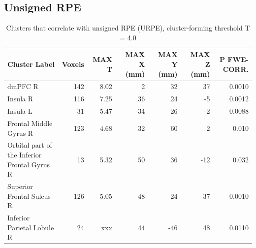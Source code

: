 \subsection{Unsigned RPE}

\begin{table}[htbp]
    \centering
    \begin{threeparttable}
    \caption{Clusters that correlate with unsigned RPE (URPE), cluster-forming threshold T = 4.0}
    \label{tab:urpe_pos}%
    \begin{tabularx}{\textwidth}{l *{6}{R}}
        \toprule
        \textbf{Cluster Label} & \textbf{Voxels} & \textbf{MAX T} & \textbf{MAX X (mm)} & \textbf{MAX Y (mm}) & \textbf{MAX Z (mm)} & \textbf{P FWE-CORR.} \\
        \midrule
        dmPFC R & 142 & 8.02 & 2 & 32 & 37 & 0.0010 \\ 
        Insula R & 116 & 7.25 & 36 & 24 & -5 & 0.0012 \\ 
        Insula L & 31 & 5.47 & -34 & 26 & -2 & 0.0088 \\ 
        Frontal Middle Gyrus R & 123 & 4.68 & 32 & 60 & 2 & 0.010 \\ 
        Orbital part of the Inferior Frontal Gyrus R & 13 & 5.32 & 50 & 36 & -12 & 0.032 \\
        Superior Frontal Sulcus R & 126 & 5.05 & 48 & 24 & 37 & 0.0010 \\
        Inferior Parietal Lobule R & 24 & xxx & 44 & -46 & 48 & 0.0110 \\
        \bottomrule
    \end{tabularx}
    \end{threeparttable}
\end{table}%